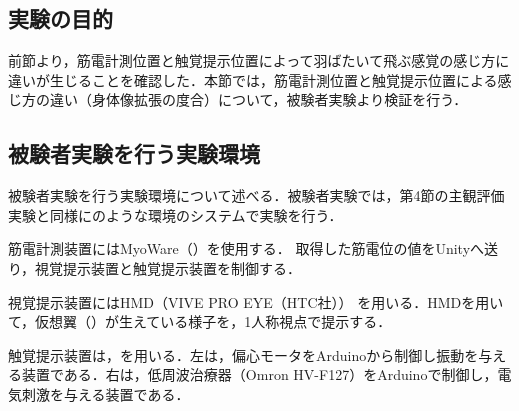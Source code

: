 \begin{small}
  \subsection{実験の目的}
    前節より，筋電計測位置と触覚提示位置によって羽ばたいて飛ぶ感覚の感じ方に違いが生じることを確認した．本節では，筋電計測位置と触覚提示位置による感じ方の違い（身体像拡張の度合）について，被験者実験より検証を行う．

  \subsection{被験者実験を行う実験環境}





        被験者実験を行う実験環境について述べる．被験者実験では，第4節の主観評価実験と同様にのような環境のシステムで実験を行う．

        筋電計測装置にはMyoWare（）を使用する．
        取得した筋電位の値をUnityへ送り，視覚提示装置と触覚提示装置を制御する．

        視覚提示装置にはHMD（VIVE PRO EYE（HTC社））
        を用いる．HMDを用いて，仮想翼（）が生えている様子を，1人称視点で提示する．




        触覚提示装置は，を用いる．左は，偏心モータをArduinoから制御し振動を与える装置である．右は，低周波治療器（Omron HV-F127）をArduinoで制御し，電気刺激を与える装置である．


\end{small}
